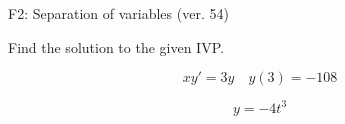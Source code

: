\begin{exercise}
  \begin{exerciseTitle}F2: Separation of variables (ver. 54)\end{exerciseTitle}
  \begin{exerciseStatement}
    
Find the solution to the given IVP.

    
\[xy'= 3 y \hspace{1em} y( 3 ) = -108\]

  \end{exerciseStatement}
  \begin{exerciseAnswer}
    
\[y= -4 t^ 3\]

  \end{exerciseAnswer}
\end{exercise}
